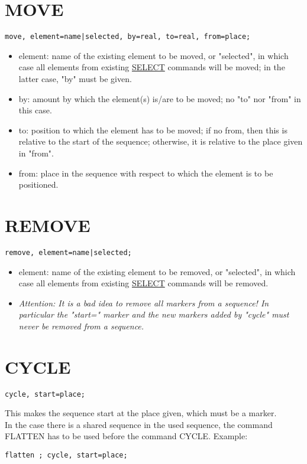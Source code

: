 \section{MOVE}
\label{sec:move}
\begin{verbatim}
move, element=name|selected, by=real, to=real, from=place;
\end{verbatim}
\begin{itemize}
   \item element: name of the existing element to be moved, or
     "selected", in which case all elements from existing
     \href{../Introduction/select.html}{SELECT} commands will be moved;
     in the latter case, "by" must be given.  
   \item by: amount by which the element(s) is/are to be moved; no "to"
     nor "from" in this case.  
   \item to: position to which the element has to be moved; if no from,
     then this is relative to the start of the sequence; otherwise, it
     is relative to the place given in "from".  
   \item from: place in the sequence with respect to which the element
     is to be positioned.  
\end{itemize}

\section{REMOVE}
\label{sec:remove}
\begin{verbatim}
remove, element=name|selected;
\end{verbatim}
\begin{itemize}
   \item element: name of the existing element to be removed, or
     "selected", in which case all elements from existing
     \href{../Introduction/select.html}{SELECT} commands will be
     removed. 
   \item \textit{Attention: It is a bad idea to remove all markers from
     a sequence! In particular the "start=" marker and the new markers
     added by "cycle" must never be removed from a sequence.} 
\end{itemize}

\section{CYCLE}
\label{sec:cycle}
\begin{verbatim}
cycle, start=place;
\end{verbatim} 
This makes the sequence start at the place given, which must be a
marker. \\ 
In the case there is a shared sequence in the used sequence, the
command FLATTEN has to be used before the command CYCLE. Example:  
\begin{verbatim}
flatten ; cycle, start=place; 
\end{verbatim}

